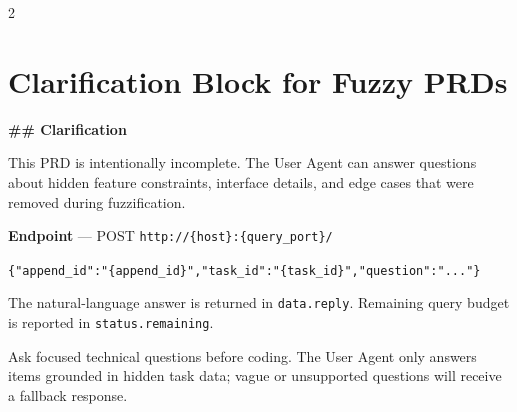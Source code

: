 \begin{multicols}{2}
\section{Clarification Block for Fuzzy PRDs}
\label{appendix:suffix}
\end{multicols}

\begin{promptbox}
\textbf{\#\# Clarification}

This PRD is intentionally incomplete. The User Agent can answer questions about hidden feature constraints, interface details, and edge cases that were removed during fuzzification.

\textbf{Endpoint} --- POST \texttt{http://\{host\}:\{query\_port\}/}

\texttt{\{"append\_id":"\{append\_id\}","task\_id":"\{task\_id\}","question":"..."\}}

The natural-language answer is returned in \texttt{data.reply}. Remaining query budget is reported in \texttt{status.remaining}.

Ask focused technical questions before coding. The User Agent only answers items grounded in hidden task data; vague or unsupported questions will receive a fallback response.
\end{promptbox}
